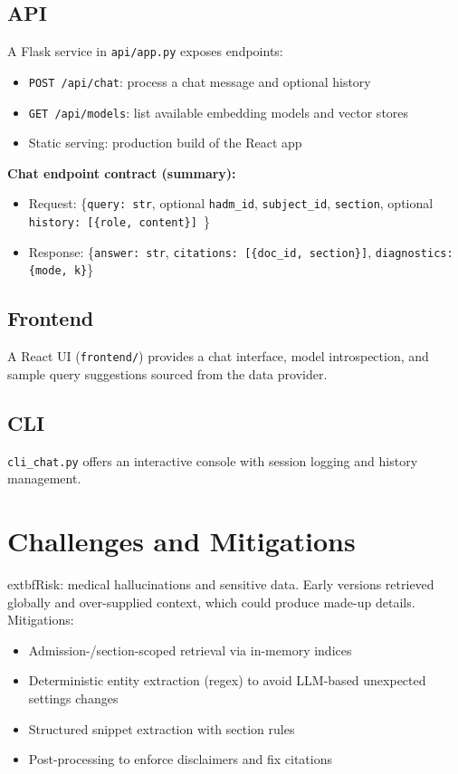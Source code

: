 \subsection{API}
A Flask service in \texttt{api/app.py} exposes endpoints:
\begin{itemize}
  \item \texttt{POST /api/chat}: process a chat message and optional history
  \item \texttt{GET /api/models}: list available embedding models and vector stores
  \item Static serving: production build of the React app
\end{itemize}

\noindent \textbf{Chat endpoint contract (summary):}
\begin{itemize}
  \item Request: \{\texttt{query: str}, optional \texttt{hadm\_id}, \texttt{subject\_id}, \texttt{section}, optional \texttt{history: [\{role, content\}] }\}
  \item Response: \{\texttt{answer: str}, \texttt{citations: [\{doc\_id, section\}]}, \texttt{diagnostics: \{mode, k\}}\}
\end{itemize}

\subsection{Frontend}
A React UI (\texttt{frontend/}) provides a chat interface, model introspection, and sample query suggestions sourced from the data provider.

\subsection{CLI}
\texttt{cli\_chat.py} offers an interactive console with session logging and history management.

\section{Challenges and Mitigations}
  	extbf{Risk: medical hallucinations and sensitive data.} Early versions retrieved globally and over-supplied context, which could produce made-up details. Mitigations:
\begin{itemize}
  \item Admission-/section-scoped retrieval via in-memory indices
  \item Deterministic entity extraction (regex) to avoid LLM-based unexpected settings changes
  \item Structured snippet extraction with section rules
  \item Post-processing to enforce disclaimers and fix citations
\end{itemize}


